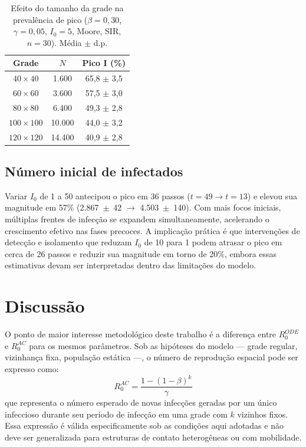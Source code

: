 \documentclass[fleqn,10pt]{wlscirep}
\begin{document}
\begin{table}[ht]
\centering
\caption{\label{tab:density}Efeito do tamanho da grade na preval\^{e}ncia de pico ($\beta = 0{,}30$, $\gamma = 0{,}05$, $I_0 = 5$, Moore, SIR, $n = 30$). M\'{e}dia $\pm$ d.p.}
\begin{tabular}{ccc}
\toprule
Grade & $N$ & Pico I (\%) \\
\midrule
$40 \times 40$   & 1.600  & 65{,}8 $\pm$ 3{,}5 \\
$60 \times 60$   & 3.600  & 57{,}5 $\pm$ 3{,}0 \\
$80 \times 80$   & 6.400  & 49{,}3 $\pm$ 2{,}8 \\
$100 \times 100$ & 10.000 & 44{,}0 $\pm$ 3{,}2 \\
$120 \times 120$ & 14.400 & 40{,}9 $\pm$ 2{,}8 \\
\bottomrule
\end{tabular}
\end{table}

\subsection*{N\'{u}mero inicial de infectados}

Variar $I_0$ de 1 a 50 antecipou o pico em 36 passos ($t = 49 \to t = 13$) e elevou sua magnitude em 57\% (2.867~$\pm$~42 $\to$ 4.503~$\pm$~140). Com mais focos iniciais, m\'{u}ltiplas frentes de infec\c{c}\~{a}o se expandem simultaneamente, acelerando o crescimento efetivo nas fases precoces. A implica\c{c}\~{a}o pr\'{a}tica \'{e} que interven\c{c}\~{o}es de detec\c{c}\~{a}o e isolamento que reduzam $I_0$ de 10 para 1 podem atrasar o pico em cerca de 26 passos e reduzir sua magnitude em torno de 20\%, embora essas estimativas devam ser interpretadas dentro das limita\c{c}\~{o}es do modelo.

\section*{Discuss\~{a}o}

O ponto de maior interesse metodol\'{o}gico deste trabalho \'{e} a diferen\c{c}a entre $R_0^{ODE}$ e $R_0^{AC}$ para os mesmos par\^{a}metros. Sob as hip\'{o}teses do modelo --- grade regular, vizinhan\c{c}a fixa, popula\c{c}\~{a}o est\'{a}tica ---, o n\'{u}mero de reprodu\c{c}\~{a}o espacial pode ser expresso como:
\begin{equation}
R_0^{AC} = \frac{1-(1-\beta)^k}{\gamma}
\end{equation}
que representa o n\'{u}mero esperado de novas infec\c{c}\~{o}es geradas por um \'{u}nico infeccioso durante seu per\'{i}odo de infec\c{c}\~{a}o em uma grade com $k$ vizinhos fixos. Essa express\~{a}o \'{e} v\'{a}lida especificamente sob as condi\c{c}\~{o}es aqui adotadas e n\~{a}o deve ser generalizada para estruturas de contato heterog\^{e}neas ou com mobilidade.
\end{document}
